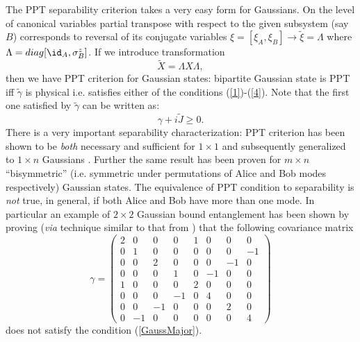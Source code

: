 \documentclass[twocolumn,aps,rmp]{revtex4}
\begin{document}
The PPT separability criterion takes a very easy form for
Gaussians. On the level of canonical variables partial transpose with
respect to the given subsystem (say $B$) corresponds to reversal of
its conjugate variables $\xi=[\xi_{A},\xi_{B}] \rightarrow
\tilde{\xi}=\Lambda$ where $\Lambda=diag[\id_{A},\sigma^z_{B}]$.  If
we introduce transformation
\begin{equation}
  \tilde{X}=\Lambda X \Lambda,
\end{equation}
then we have PPT criterion for Gaussian states: bipartite Gaussian
state is PPT iff $\tilde{\gamma}$ is physical i.e. satisfies either of
the conditions (\ref{1})-(\ref{4}). Note that the first one satisfied
by $\tilde{\gamma}$ can be written as:
\begin{equation}
\gamma + i \tilde{J} \geq 0.
\end{equation}
There is a very important separability characterization: PPT criterion
has been shown to be {\it both} necessary and sufficient for $1 \times
1$ \cite{Simon,DuanGCZ1999-criterion} and subsequently generalized to
$1 \times n$ Gaussians \cite{WernerWolf}. Further the same result has
been proven for $m \times n$ ``bisymmetric'' \cite{Serafini,SerafiniAI2005}
(i.e. symmetric under permutations of Alice and Bob modes
respectively) Gaussian states. The equivalence of PPT condition to
separability is {\it not} true, in general, if both Alice and Bob have
more than one mode. In particular an example of $ 2 \times 2$ Gaussian
bound entanglement has been shown by proving ({\it via} technique
similar to that from \cite{LewensteinSanpera-bsa}) that the following
covariance matrix
\begin{equation}
\gamma=\left(\begin{array}{cccccccc}
2 & 0&0 & 0& 1&0 &0 &0\\
0 & 1&0 & 0& 0&0 &0 &-1\\
0 & 0&2 & 0& 0&0 &-1 &0\\
0 & 0&0 & 1& 0&-1 &0 &0\\
1 & 0&0 & 0& 2&0 &0 &0\\
0 & 0&0 & -1& 0&4 &0 &0\\
0 & 0&-1 & 0& 0&0 &2 &0\\
0 &-1&0 & 0& 0&0 &0 & 4
\end{array} \right)
\end{equation}
does not satisfy the condition (\ref{GaussMajor}).
\end{document}
